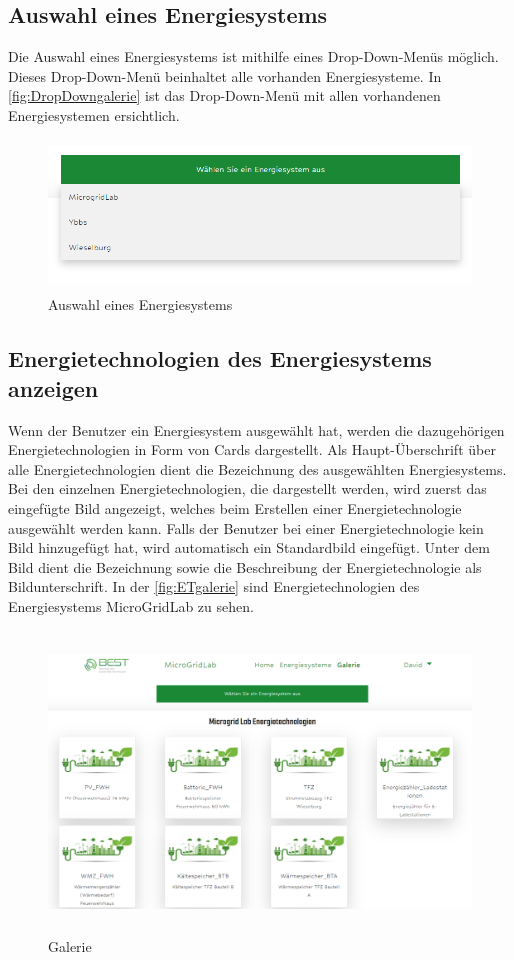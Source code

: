 \subsection{Auswahl eines Energiesystems}
Die Auswahl eines Energiesystems ist mithilfe eines Drop-Down-Menüs möglich. Dieses Drop-Down-Menü beinhaltet alle vorhanden Energiesysteme. In \autoref{fig:DropDowngalerie} ist das Drop-Down-Menü mit allen vorhandenen Energiesystemen ersichtlich.
\begin{figure}[h]
	\centering
	\includegraphics[height=4cm,width=14cm]{images/GalerieDropDown}
	\caption{Auswahl eines Energiesystems}
	\label{fig:DropDowngalerie}
\end{figure}


\newpage
\subsection{Energietechnologien des Energiesystems anzeigen}
Wenn der Benutzer ein Energiesystem ausgewählt hat, werden die dazugehörigen Energietechnologien in Form von Cards dargestellt.
Als Haupt-Überschrift über alle Energietechnologien dient die Bezeichnung des ausgewählten Energiesystems.
Bei den einzelnen Energietechnologien, die dargestellt werden, wird zuerst das eingefügte Bild angezeigt, welches beim Erstellen einer Energietechnologie ausgewählt werden kann. Falls der Benutzer bei einer Energietechnologie kein Bild hinzugefügt hat, wird automatisch ein Standardbild eingefügt. Unter dem Bild dient die Bezeichnung sowie die Beschreibung der Energietechnologie als Bildunterschrift. In der \autoref{fig:ETgalerie} sind Energietechnologien des Energiesystems MicroGridLab zu sehen.

\begin{figure}[h]
	\centering
	\includegraphics[height=8cm,width=14cm]{images/GalerieET2}
	\caption{Galerie}
	\label{fig:ETgalerie}
\end{figure}


